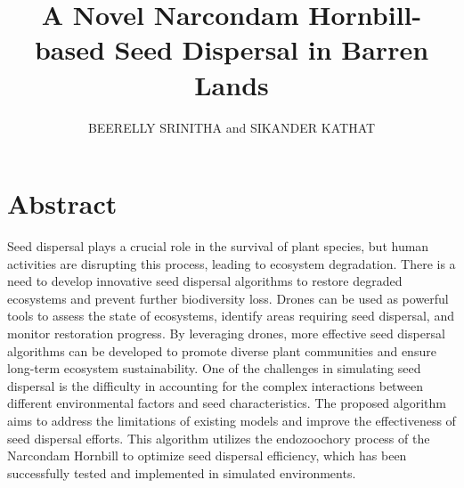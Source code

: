 \documentclass[pmlr,twocolumn,10pt]{jmlr}
\begin{document}
\title{A Novel Narcondam Hornbill-based Seed Dispersal in Barren Lands}
\author{BEERELLY SRINITHA and SIKANDER KATHAT}

\maketitle

\section*{Abstract}
Seed dispersal plays a crucial role in the survival of plant species, but human activities are disrupting this process, leading to ecosystem degradation. There is a need to develop innovative seed dispersal algorithms to restore degraded ecosystems and prevent further biodiversity loss. Drones can be used as powerful tools to assess the state of ecosystems, identify areas requiring seed dispersal, and monitor restoration progress. By leveraging drones, more effective seed dispersal algorithms can be developed to promote diverse plant communities and ensure long-term ecosystem sustainability. One of the challenges in simulating seed dispersal is the difficulty in accounting for the complex interactions between different environmental factors and seed characteristics. The proposed algorithm aims to address the limitations of existing models and improve the effectiveness of seed dispersal efforts. This algorithm utilizes the endozoochory process of the Narcondam Hornbill to optimize seed dispersal efficiency, which has been successfully tested and implemented in simulated environments.
\end{document}

